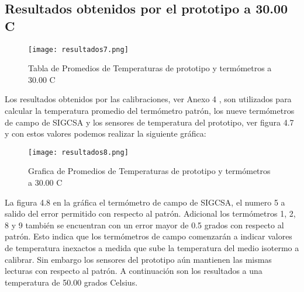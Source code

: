 \subsection{Resultados obtenidos por el prototipo a 30.00 C}

\begin{figure}[H]
	\centering
	\texttt{[image: resultados7.png]}
	\caption{Tabla de Promedios de Temperaturas de prototipo y termómetros a 30.00 C}
\end{figure}

\par \noindent 
Los resultados obtenidos por las calibraciones, ver Anexo 4 , son utilizados para calcular la temperatura promedio del termómetro patrón, los nueve termómetros de campo de SIGCSA y los sensores de temperatura del prototipo, ver figura 4.7 y con estos valores podemos realizar la siguiente gráfica:

\begin{figure}[H]
	\centering
	\texttt{[image: resultados8.png]}
	\caption{Grafica de Promedios de Temperaturas de prototipo y termómetros a 30.00 C}
\end{figure}

\par \noindent
La figura 4.8 en la gráfica el termómetro de campo de SIGCSA, el numero 5 a salido del error permitido con respecto al patrón. Adicional los termómetros 1, 2, 8 y 9 también se encuentran con un error mayor de 0.5 grados con respecto al  patrón. Esto indica que los termómetros de campo comenzarán a indicar valores de temperatura inexactos a medida que sube la temperatura del medio isotermo a calibrar. Sin embargo los sensores del prototipo aún mantienen las mismas lecturas con respecto al patrón. A continuación son los resultados a una temperatura de 50.00 grados Celsius.
